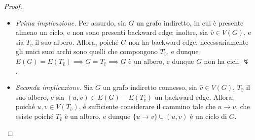\documentclass[14pt]{extreport}
\theoremstyle{definition}
\theoremstyle{definition}
\begin{document}
\begin{proof}
    \hspace{0.7cm}
    \begin{itemize}
        \item[] \textit{Prima implicazione.} Per assurdo, sia $G$ un grafo indiretto, in cui è presente almeno un ciclo, e non sono presenti backward edge; inoltre, sia $\hat v \in V(G)$, e sia $T_{\hat v}$ il suo albero. Allora, poiché $G$ non ha backward edge, necessariamente gli unici suoi archi sono quelli che compongono $T_{\hat v}$, e dunque $E(G) = E(T_{\hat v}) \implies G = T_{\hat v} \implies G$ è un albero, e dunque $G$ non ha cicli $\lightning$.
        \item[] \textit{Seconda implicazione.} Sia $G$ un grafo indiretto connesso, sia $\hat v \in V(G)$, $T_{\hat v}$ il suo albero, e sia $(u, v) \in E(G) - E(T_{\hat v})$ un backward edge. Allora, poiché $u, v \in V(T_{\hat v})$, è sufficiente considerare il cammino tale che $u \rightarrow v$, che esiste poiché $T_{\hat v}$ è un albero, e dunque $\{u \rightarrow v\} \cup (u, v)$ è un ciclo di $G$.
    \end{itemize}
\end{proof}
\end{document}

